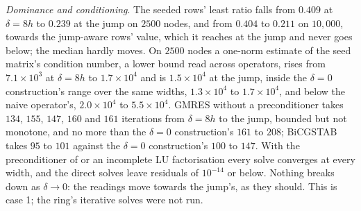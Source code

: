 \documentclass[11pt]{amsart}
\theoremstyle{definition}
\theoremstyle{remark}
\newcommand{\para}[1]{\par\smallskip\noindent\textit{#1}.\enspace}
\newcommand{\sci}[2]{#1 \times 10^{#2}}
\begin{document}
\para{Dominance and conditioning}
The seeded rows' least ratio falls from $0.409$ at $\delta = 8h$ to $0.239$
at the jump on $2500$ nodes, and from $0.404$ to $0.211$ on $10{,}000$,
towards the jump-aware rows' value, which it reaches at the jump and never
goes below; the median hardly moves. On $2500$ nodes a one-norm estimate of the seed
matrix's condition number, a lower bound read across operators, rises from
$\sci{7.1}{3}$ at $\delta = 8h$ to $\sci{1.7}{4}$ and is $\sci{1.5}{4}$ at the
jump, inside the $\delta = 0$ construction's range over the same widths, $\sci{1.3}{4}$
to $\sci{1.7}{4}$, and below the naive operator's, $\sci{2.0}{4}$ to
$\sci{5.5}{4}$. GMRES without a preconditioner takes $134$, $155$, $147$,
$160$ and $161$ iterations from $\delta = 8h$ to the jump, bounded but not
monotone, and no more than the $\delta = 0$ construction's $161$ to $208$; BiCGSTAB takes
$95$ to $101$ against the $\delta = 0$ construction's $100$ to $147$. With the
preconditioner of \cite[App.~B]{Martin2016} or an incomplete LU factorisation
every solve converges at every width, and the direct solves leave residuals
of $10^{-14}$ or below. Nothing breaks down as $\delta \to 0$: the readings
move towards the jump's, as they should. This is case 1; the ring's
iterative solves were not run.

\begin{table}
  \centering
  \caption{The matrices on case 1, interior system: the seeded rows'
  diagonal dominance ratio (least and median), a one-norm condition estimate
  of the matrix, and the iterations of GMRES and BiCGSTAB without a
  preconditioner to a relative residual of $10^{-8}$. Italic lines: the
  other operators' ranges over the same widths, their ratios over the
  crossing rows.}
  \label{tab:solvability2d}
  \footnotesize
  
\end{table}
\end{document}
